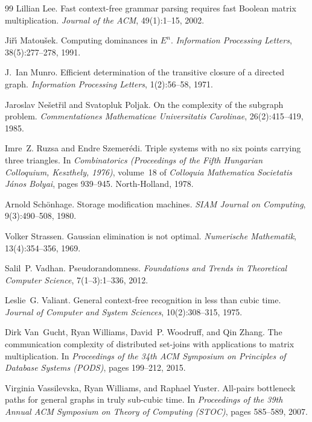 \documentclass[11pt]{article}
\theoremstyle{definition}
\begin{document}
\begin{thebibliography}{99}
Lillian Lee.
\newblock Fast context-free grammar parsing requires fast Boolean matrix multiplication.
\newblock \emph{Journal of the ACM}, 49(1):1--15, 2002.

Ji\v{r}\'{\i} Matou\v{s}ek.
\newblock Computing dominances in $E^n$.
\newblock \emph{Information Processing Letters}, 38(5):277--278, 1991.

J.~Ian Munro.
\newblock Efficient determination of the transitive closure of a directed graph.
\newblock \emph{Information Processing Letters}, 1(2):56--58, 1971.

Jaroslav Ne\v{s}et\v{r}il and Svatopluk Poljak.
\newblock On the complexity of the subgraph problem.
\newblock \emph{Commentationes Mathematicae Universitatis Carolinae}, 26(2):415--419, 1985.

Imre~Z. Ruzsa and Endre Szemer\'edi.
\newblock Triple systems with no six points carrying three triangles.
\newblock In \emph{Combinatorics (Proceedings of the Fifth Hungarian Colloquium, Keszthely, 1976)}, volume~18 of \emph{Colloquia Mathematica Societatis J\'anos Bolyai}, pages 939--945. North-Holland, 1978.

Arnold Sch\"onhage.
\newblock Storage modification machines.
\newblock \emph{SIAM Journal on Computing}, 9(3):490--508, 1980.

Volker Strassen.
\newblock Gaussian elimination is not optimal.
\newblock \emph{Numerische Mathematik}, 13(4):354--356, 1969.

Salil~P. Vadhan.
\newblock Pseudorandomness.
\newblock \emph{Foundations and Trends in Theoretical Computer Science}, 7(1--3):1--336, 2012.

Leslie~G. Valiant.
\newblock General context-free recognition in less than cubic time.
\newblock \emph{Journal of Computer and System Sciences}, 10(2):308--315, 1975.

Dirk Van~Gucht, Ryan Williams, David~P. Woodruff, and Qin Zhang.
\newblock The communication complexity of distributed set-joins with applications to matrix multiplication.
\newblock In \emph{Proceedings of the 34th ACM Symposium on Principles of Database Systems (PODS)}, pages 199--212, 2015.

Virginia Vassilevska, Ryan Williams, and Raphael Yuster.
\newblock All-pairs bottleneck paths for general graphs in truly sub-cubic time.
\newblock In \emph{Proceedings of the 39th Annual ACM Symposium on Theory of Computing (STOC)}, pages 585--589, 2007.


\end{thebibliography}
\end{document}

